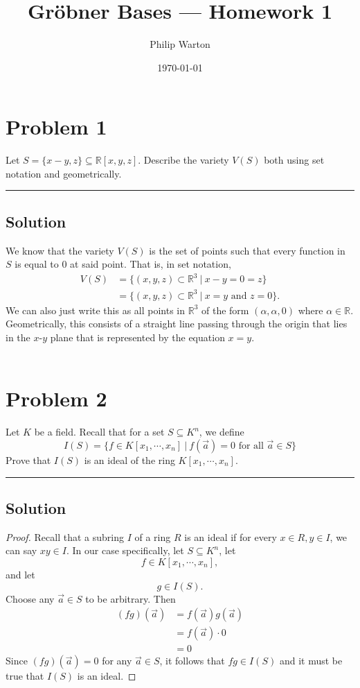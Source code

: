 \documentclass{article}
\theoremstyle{definition}
\begin{document}
\title{Gr{\"o}bner Bases --- Homework 1}
\author{Philip Warton}
\date{\today}
\maketitle

\section*{Problem 1}
Let $S = \{x - y, z \} \subseteq \mathbb{R}[x,y,z]$. Describe the variety $V(S)$ both using set notation and geometrically.
\\
\par\noindent\rule{\textwidth}{0.4pt}
\subsection*{Solution}
We know that the variety $V(S)$ is the set of points such that every function in $S$ is equal to 0 at said point.
That is, in set notation,
\begin{align*}
    V(S) &= \{(x,y,z) \subset \mathbb{R}^3 \ | \ x - y = 0 = z \} \\
    &= \{(x,y,z) \subset \mathbb{R}^3 \ | \ x = y \text{ and } z = 0\}.
\end{align*}
We can also just write this as all points in $\mathbb{R}^3$ of the form $(\alpha, \alpha, 0)$ where $\alpha \in \mathbb{R}$.
Geometrically, this consists of a straight line passing through the origin that lies in the $x$-$y$ plane 
that is represented by the equation $x = y$.
\\\\
\section*{Problem 2}
Let $K$ be a field. Recall that for a set $S \subseteq K^n$, we define
\[
    I(S) = \{f \in K[x_1, \cdots, x_n] \ | \ f(\vec a) = 0 \text{ for all } \vec a \in S\}
\]
Prove that $I(S)$ is an ideal of the ring $K[x_1, \cdots, x_n]$.
\\
\par\noindent\rule{\textwidth}{0.4pt}
\subsection*{Solution}
\begin{proof}
Recall that a subring $I$ of a ring $R$ is an ideal if for every $x \in R, y \in I$,
we can say $xy \in I$.
In our case specifically, let $S \subseteq K^n$, let
\[
    f \in K[x_1, \cdots, x_n]    
,\]
and let 
\[
    g \in I(S)
.\]
Choose any $\vec a \in S$ to be arbitrary. Then 
\begin{align*}
    (fg)(\vec a) &= f(\vec a)g(\vec a) \\
    &= f(\vec a) \cdot 0 \\
    &= 0
\end{align*}
Since $(fg)(\vec a) = 0$ for any $\vec a \in S$, it follows that $fg \in I(S)$
and it must be true that $I(S)$ is an ideal.
\end{proof}
\end{document}
